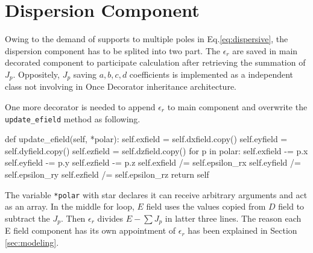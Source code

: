 \section{Dispersion Component}
Owing to the demand of supports to multiple poles in Eq.\ref{eq:dispersive}, the dispersion component has to be splited
into two part. The $\epsilon_r$ are saved in main decorated component to participate calculation after retrieving the
summation of $J_p$. Oppositely, $J_p$ saving $a,b,c,d$ coefficients is implemented as a independent class not involving
in Once Decorator inheritance architecture.

One more decorator is needed to append $\epsilon_r$ to main component and overwrite the \texttt{update\_efield} method
as following. 
\begin{code}
    def update_efield(self, *polar):
        self.exfield  = self.dxfield.copy()
        self.eyfield  = self.dyfield.copy()
        self.ezfield  = self.dzfield.copy()
        for p in polar:
            self.exfield -= p.x
            self.eyfield -= p.y
            self.ezfield -= p.z
        self.exfield /= self.epsilon_rx
        self.eyfield /= self.epsilon_ry
        self.ezfield /= self.epsilon_rz
        return self
\end{code}
The variable \texttt{*polar} with star declares it can receive arbitrary arguments and act as an array. In the middle
for loop, $E$ field uses the values copied from $D$ field to subtract the $J_p$. Then $\epsilon_r$ divides $E - \sum
J_p$ in latter three lines. The reason each E field component has its own appointment of $\epsilon_{r}$ has been
explained in Section \ref{sec:modeling}.

